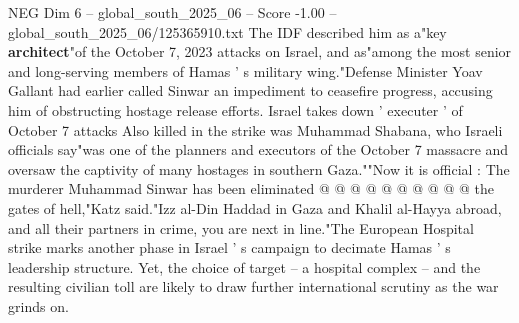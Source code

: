 \begin{textsample}{NEG Dim 6 – global\_south\_2025\_06 – Score -1.00 – global\_south\_2025\_06/125365910.txt}
The IDF described him as a"key \textbf{architect}"of the October 7, 2023 attacks on Israel, and as"among the most senior and long-serving members of Hamas ' s military wing."Defense Minister Yoav Gallant had earlier called Sinwar an impediment to ceasefire progress, accusing him of obstructing hostage release efforts.
Israel takes down ' executer ' of October 7 attacks Also killed in the strike was Muhammad Shabana, who Israeli officials say"was one of the planners and executors of the October 7 massacre and oversaw the captivity of many hostages in southern Gaza.""Now it is official : The murderer Muhammad Sinwar has been eliminated @ @ @ @ @ @ @ @ @ @ the gates of hell,"Katz said."Izz al-Din Haddad in Gaza and Khalil al-Hayya abroad, and all their partners in crime, you are next in line."The European Hospital strike marks another phase in Israel ' s campaign to decimate Hamas ' s leadership structure.
Yet, the choice of target -- a hospital complex -- and the resulting civilian toll are likely to draw further international scrutiny as the war grinds on.

\end{textsample}
